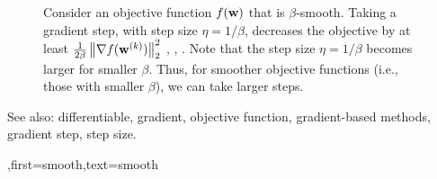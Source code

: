 {{\begin{figure}[H]
\begin{center}
	    	\end{center}
	    	\caption{Consider an objective function $f({\bf w})$ that is $\beta$-smooth. 
	    		Taking a gradient step, with step size $\eta = 1/\beta$, decreases the 
	    		objective by at least $\frac{1}{2\beta}\left\Vert  {\nabla f({\bf w}^{(k)})} \right\Vert_{2}^{2}$ \cite{nesterov04}, \cite{CvxBubeck2015}, \cite{CvxAlgBertsekas}. 
	    		Note that the step size $\eta = 1/\beta$ becomes larger for smaller $\beta$. Thus, 
	    		for smoother objective functions (i.e., those with smaller $\beta$), 
				we can take larger steps. \label{fig_gd_smooth_dict}}
	    	\end{figure}
		See also: differentiable, gradient, objective function, gradient-based methods, gradient step, step size.
	    },first={smooth},text={smooth}}

